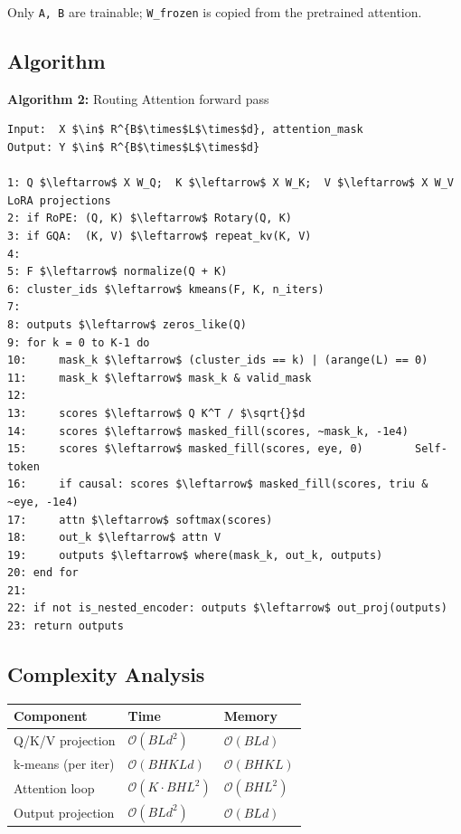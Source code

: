 Only \texttt{A, B} are trainable; \texttt{W\_frozen} is copied from the pretrained attention.

\subsection{Algorithm}

\textbf{Algorithm 2:} Routing Attention forward pass
\begin{lstlisting}
Input:  X $\in$ R^{B$\times$L$\times$d}, attention_mask
Output: Y $\in$ R^{B$\times$L$\times$d}

1: Q $\leftarrow$ X W_Q;  K $\leftarrow$ X W_K;  V $\leftarrow$ X W_V        LoRA projections
2: if RoPE: (Q, K) $\leftarrow$ Rotary(Q, K)
3: if GQA:  (K, V) $\leftarrow$ repeat_kv(K, V)
4:
5: F $\leftarrow$ normalize(Q + K)
6: cluster_ids $\leftarrow$ kmeans(F, K, n_iters)
7:
8: outputs $\leftarrow$ zeros_like(Q)
9: for k = 0 to K-1 do
10:     mask_k $\leftarrow$ (cluster_ids == k) | (arange(L) == 0)
11:     mask_k $\leftarrow$ mask_k & valid_mask
12:
13:     scores $\leftarrow$ Q K^T / $\sqrt{}$d
14:     scores $\leftarrow$ masked_fill(scores, ~mask_k, -1e4)
15:     scores $\leftarrow$ masked_fill(scores, eye, 0)        Self-token
16:     if causal: scores $\leftarrow$ masked_fill(scores, triu & ~eye, -1e4)
17:     attn $\leftarrow$ softmax(scores)
18:     out_k $\leftarrow$ attn V
19:     outputs $\leftarrow$ where(mask_k, out_k, outputs)
20: end for
21:
22: if not is_nested_encoder: outputs $\leftarrow$ out_proj(outputs)
23: return outputs
\end{lstlisting}

\subsection{Complexity Analysis}

\begin{table}[H]
\centering
\small
\begin{tabular}{lll}
\toprule
\textbf{Component} & \textbf{Time} & \textbf{Memory} \\
\midrule
Q/K/V projection & $\mathcal{O}(BLd^2)$ & $\mathcal{O}(BLd)$ \\
k-means (per iter) & $\mathcal{O}(BHKLd)$ & $\mathcal{O}(BHKL)$ \\
Attention loop & $\mathcal{O}(K \cdot BHL^2)$ & $\mathcal{O}(BHL^2)$ \\
Output projection & $\mathcal{O}(BLd^2)$ & $\mathcal{O}(BLd)$ \\
\bottomrule
\end{tabular}
\end{table}

